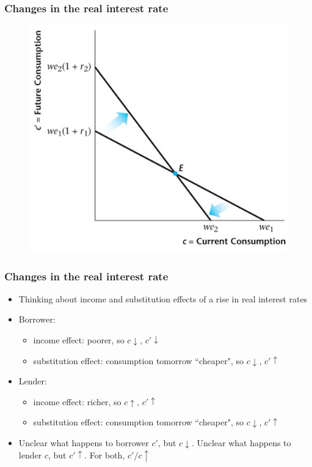 \documentclass{beamer}
\begin{document}
\begin{frame}
\frametitle[alignment=center]{Changes in the real interest rate}
\begin{figure}
\centering
\includegraphics[scale=0.5]{Figures/W_Fig_9pt12.png}
\end{figure}
\end{frame}

\begin{frame}
\frametitle[alignment=center]{Changes in the real interest rate}
\begin{itemize}
\item Thinking about income and substitution effects of a rise in real interest rates
\bigskip
\item Borrower: 
\begin{itemize}
\item  income effect: poorer, so $c\downarrow$, $c'\downarrow$
\item substitution effect: consumption tomorrow ``cheaper", so $c\downarrow$, $c'\uparrow$
\end{itemize}
\item Lender: 
\begin{itemize}
\item  income effect: richer, so $c\uparrow$, $c'\uparrow$
\item substitution effect: consumption tomorrow ``cheaper", so $c\downarrow$, $c'\uparrow$
\end{itemize}
\item Unclear what happens to borrower $c'$, but $c\downarrow$.  Unclear what happens to lender $c$, but $c'\uparrow$.  For both, $c'/c\uparrow$
\end{itemize}
\end{frame}
\end{document}
